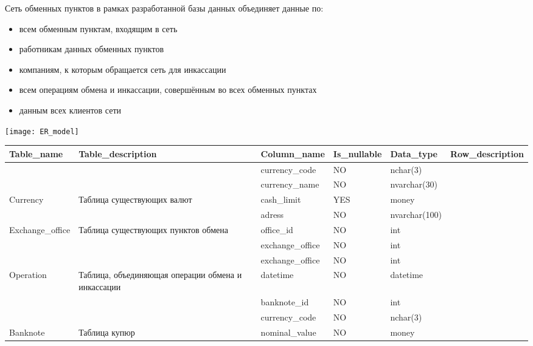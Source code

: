 \documentclass{article}
\begin{document}
Сеть обменных пунктов в рамках разработанной базы данных объединяет данные по:
\begin{itemize}
\item всем обменным пунктам, входящим в сеть
\item работникам данных обменных пунктов
\item компаниям, к которым обращается сеть для инкассации
\item всем операциям обмена и инкассации, совершённым во всех обменных пунктах
\item данным всех клиентов сети
\end{itemize}
\begin{center}
\texttt{[image: ER\_model]}
\newpage
\bgroup
\def\arraystretch{1.06}
\begin{tabular}{|l| m{4cm}| m{3.2cm}| m{2cm}| m{2cm}| l|}
\hline
\rowcolor{Vyshka}
Table\_name &Table\_description &Column\_name &Is\_nullable &Data\_type &Row\_description\\ \hline
 &&currency\_code &NO &nchar(3) & \noindent\\  \cline{3-6}
&&currency\_name &NO &nvarchar(30) & \noindent\\ \cline{3-6}
\multirow{-3}{*}{Currency} & \multirow{-2}{4cm}{Таблица существующих валют }&cash\_limit &YES &money & \noindent\\ \hline
 
 
 &&adress	&NO	&nvarchar(100)&\\ \cline{3-6}
  \multirow{-2}{*}{Exchange\_office} &\multirow{-2}{4cm}{Таблица существующих пунктов обмена}& office\_id &NO &int&\\ \hline
  
   
 &&exchange\_office &NO&int&\\ \cline{3-6}
  	
&&exchange\_office&NO&int&\\ \cline{3-6}
 
  \multirow{-3}{*}{Operation} & \multirow{-3}{4cm}{Таблица, объединяющая операции обмена и инкассации} & datetime	& NO & datetime&\\ \hline
  
  &&banknote\_id&NO	&int&\\ \cline{3-6}
  &&currency\_code&NO&nchar(3)&\\ \cline{3-6}
   \multirow{-3}{*}{Banknote} & \multirow{-3}{*}{Таблица купюр}&nominal\_value&NO&money&\\ \hline
   
   
      

\end{tabular}
\end{center}
\end{document}
